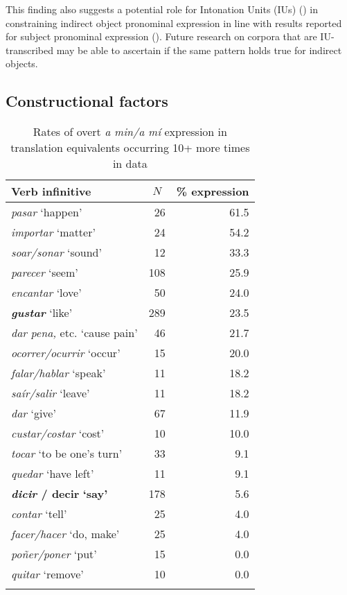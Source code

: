 \documentclass[output=paper]{langscibook}
\begin{document}
This finding also suggests a potential role for Intonation Units (IUs) (\citealt{DuBoisPaolino1993}) in constraining indirect object pronominal expression in line with results reported for subject pronominal expression (\citealt{TravisCacoullos2012, TorresCacoullosTravis2014}). Future research on corpora that are IU-transcribed may be able to ascertain if the same pattern holds true for indirect objects.

\subsection{Constructional factors}

\begin{table}[ht]
\begin{tabular}{lrr}
\lsptoprule
{Verb infinitive} & \multicolumn{1}{c}{$N$} & \multicolumn{1}{c}{\% expression}\\\midrule
\textit{pasar} ‘happen’ & 26 & 61.5\\
\textit{importar} ‘matter’ & 24 & 54.2\\
\textit{soar\slash sonar} ‘sound’ & 12 & 33.3\\
\textit{parecer} ‘seem’ & 108 & 25.9\\
\textit{encantar} ‘love’ & 50 & 24.0\\
\textbf{\textit{gustar}} ‘like’ & 289 & 23.5\\
\textit{dar} \textit{pena,} etc. ‘cause pain’ & 46 & 21.7\\
\textit{ocorrer\slash ocurrir} ‘occur’ & 15 & 20.0\\\hdashline
\textit{falar\slash hablar} ‘speak’ & 11 & 18.2\\
\textit{saír\slash salir} ‘leave’ & 11 & 18.2\\
\textit{dar} ‘give’ & 67 & 11.9\\
\textit{custar\slash costar} ‘cost’ & 10 & 10.0\\
\textit{tocar} ‘to be one’s turn’ & 33 & 9.1\\
\textit{quedar} ‘have left’ & 11 & 9.1\\
\textbf{\textit{dicir} \textbf{/} \textbf{decir}} \textbf{‘say’} & 178 & 5.6\\
\textit{contar} ‘tell’ & 25 & 4.0\\
\textit{facer\slash hacer} ‘do, make’ & 25 & 4.0\\
\textit{poñer\slash poner} ‘put’ & 15 & 0.0\\
\textit{quitar} ‘remove’ & 10 & 0.0\\
\lspbottomrule
\end{tabular}
\caption{Rates of overt \textit{a min/a mí} expression in translation equivalents occurring 10+ more times in data\label{tab:brown:4}}
\end{table}
\end{document}
